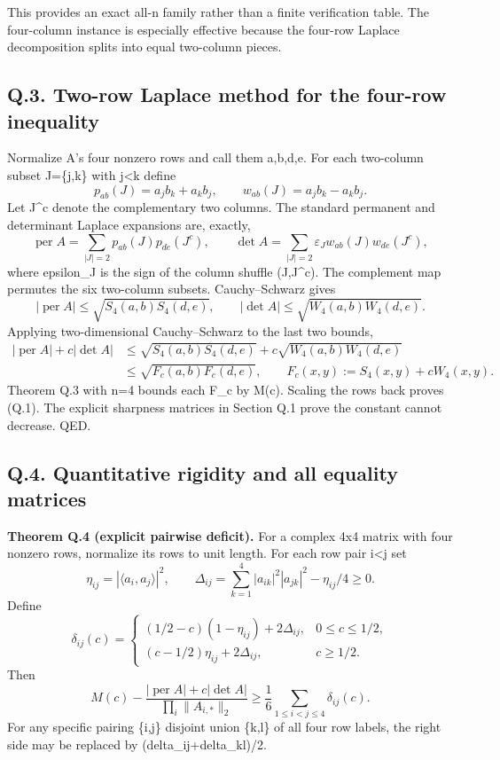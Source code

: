 \documentclass[
  11pt,
]{article}
\begin{document}
This provides an exact all-n family rather than a finite verification
table. The four-column instance is especially effective because the
four-row Laplace decomposition splits into equal two-column pieces.

\subsection{Q.3. Two-row Laplace method for the four-row
inequality}\label{q.3.-two-row-laplace-method-for-the-four-row-inequality}

Normalize A's four nonzero rows and call them a,b,d,e. For each
two-column subset J=\{j,k\} with j\textless k define \[
p_{ab}(J)=a_jb_k+a_kb_j,\qquad
w_{ab}(J)=a_jb_k-a_kb_j.
\] Let J\^{}c denote the complementary two columns. The standard
permanent and determinant Laplace expansions are, exactly, \[
\operatorname{per}A=\sum_{|J|=2}p_{ab}(J)p_{de}(J^c),\qquad
\det A=\sum_{|J|=2}\varepsilon_J w_{ab}(J)w_{de}(J^c),
\tag{Q.8}
\] where epsilon\_J is the sign of the column shuffle (J,J\^{}c). The
complement map permutes the six two-column subsets. Cauchy--Schwarz
gives \[
|\operatorname{per}A|\le\sqrt{S_4(a,b)S_4(d,e)},\qquad
|\det A|\le\sqrt{W_4(a,b)W_4(d,e)}.\tag{Q.9}
\] Applying two-dimensional Cauchy--Schwarz to the last two bounds, \[
\begin{aligned}
|\operatorname{per}A|+c|\det A|
&\le\sqrt{S_4(a,b)S_4(d,e)}
+c\sqrt{W_4(a,b)W_4(d,e)}\\
&\le\sqrt{F_c(a,b)F_c(d,e)},\qquad
F_c(x,y):=S_4(x,y)+cW_4(x,y).
\end{aligned}\tag{Q.10}
\] Theorem Q.3 with n=4 bounds each F\_c by M(c). Scaling the rows back
proves (Q.1). The explicit sharpness matrices in Section Q.1 prove the
constant cannot decrease. QED.

\subsection{Q.4. Quantitative rigidity and all equality
matrices}\label{q.4.-quantitative-rigidity-and-all-equality-matrices}

\textbf{Theorem Q.4 (explicit pairwise deficit).} For a complex 4x4
matrix with four nonzero rows, normalize its rows to unit length. For
each row pair i\textless j set \[
\eta_{ij}=|\langle a_i,a_j\rangle|^2,\qquad
\Delta_{ij}=\sum_{k=1}^{4}|a_{ik}|^2|a_{jk}|^2-\eta_{ij}/4\ge0.
\] Define \[
\delta_{ij}(c)=
\begin{cases}
(1/2-c)(1-\eta_{ij})+2\Delta_{ij},&0\le c\le1/2,\\
(c-1/2)\eta_{ij}+2\Delta_{ij},&c\ge1/2.
\end{cases}\tag{Q.11}
\] Then \[
\boxed{
M(c)-\frac{|\operatorname{per}A|+c|\det A|}
{\prod_i\|A_{i,*}\|_2}
\ge\frac16\sum_{1\le i<j\le4}\delta_{ij}(c).
}\tag{Q.12}
\] For any specific pairing \{i,j\} disjoint union \{k,l\} of all four
row labels, the right side may be replaced by (delta\_ij+delta\_kl)/2.
\end{document}
